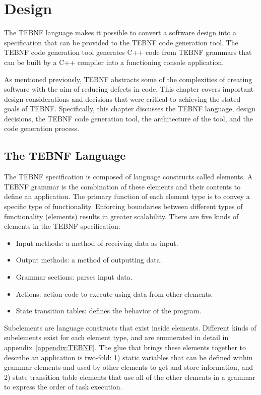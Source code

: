 \chapter{Design}
\label{chapters:Design}
The TEBNF language makes it possible to convert a software design into a specification that can be provided to the TEBNF code generation tool.  The TEBNF code generation tool generates C++ code from TEBNF grammars that can be built by a C++ compiler into a functioning console application.

\indent
As mentioned previously, TEBNF abstracts some of the complexities of creating software with the aim of reducing defects in code.  This chapter covers important design considerations and decisions that were critical to achieving the stated goals of TEBNF.  Specifically, this chapter discusses the TEBNF language, design decisions, the TEBNF code generation tool, the architecture of the tool, and the code generation process.

\section{The TEBNF Language}
The TEBNF specification is composed of language constructs called elements.  A TEBNF grammar is the combination of these elements and their contents to define an application.   The primary function of each element type is to convey a specific type of functionality.  Enforcing boundaries between different types of functionality (elements) results in greater scalability.  There are five kinds of elements in the TEBNF specification:
\begin{itemize}
  \item Input methods: a method of receiving data as input.
  \item Output methods: a method of outputting data.
  \item Grammar sections: parses input data. 
  \item Actions: action code to execute using data from other elements.
  \item State transition tables: defines the behavior of the program.
\end{itemize}

\indent
Subelements are language constructs that exist inside elements.  Different kinds of subelements exist for each element type, and are enumerated in detail in appendix~\ref{appendix:TEBNF}.  The glue that brings these elements together to describe an application is two-fold: 1) static variables that can be defined within grammar elements and used by other elements to get and store information, and 2) state transition table elements that use all of the other elements in a grammar to express the order of task execution.

